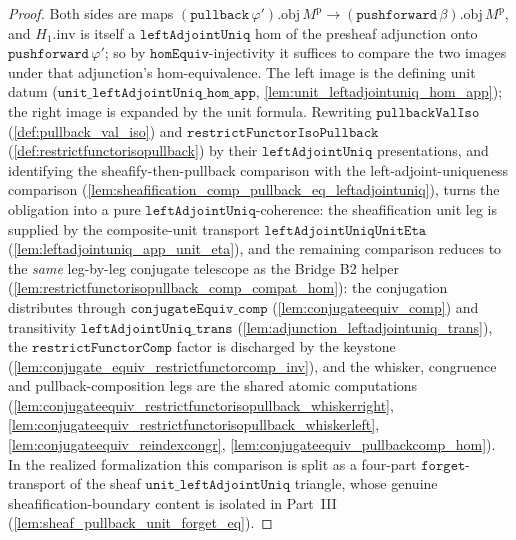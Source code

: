 \begin{proof}
    \leanok
  Both sides are maps \((\mathtt{pullback}\,\varphi').\mathrm{obj}\,M^{\mathrm p} \to
  (\mathtt{pushforward}\,\beta).\mathrm{obj}\,M^{\mathrm p}\), and \(H_1.\mathrm{inv}\) is itself a
  \(\mathtt{leftAdjointUniq}\) hom of the presheaf adjunction onto \(\mathtt{pushforward}\,\varphi'\);
  so by \(\mathtt{homEquiv}\)-injectivity it suffices to compare the two images under that adjunction's
  hom-equivalence. The left image is the defining unit datum
  (\(\mathtt{unit\_leftAdjointUniq\_hom\_app}\), \cref{lem:unit_leftadjointuniq_hom_app}); the right image
  is expanded by the unit formula. Rewriting \(\mathtt{pullbackValIso}\)
  (\cref{def:pullback_val_iso}) and \(\mathtt{restrictFunctorIsoPullback}\)
  (\cref{def:restrictfunctorisopullback}) by their \(\mathtt{leftAdjointUniq}\) presentations, and
  identifying the sheafify-then-pullback comparison with the left-adjoint-uniqueness comparison
  (\cref{lem:sheafification_comp_pullback_eq_leftadjointuniq}), turns the obligation into a pure
  \(\mathtt{leftAdjointUniq}\)-coherence: the sheafification unit leg is supplied by the composite-unit
  transport \(\mathtt{leftAdjointUniqUnitEta}\) (\cref{lem:leftadjointuniq_app_unit_eta}), and the
  remaining comparison reduces to the \emph{same} leg-by-leg conjugate telescope as the Bridge B2
  helper (\cref{lem:restrictfunctorisopullback_comp_compat_hom}): the conjugation distributes through
  \(\mathtt{conjugateEquiv\_comp}\) (\cref{lem:conjugateequiv_comp}) and transitivity
  \(\mathtt{leftAdjointUniq\_trans}\) (\cref{lem:adjunction_leftadjointuniq_trans}), the
  \(\mathtt{restrictFunctorComp}\) factor is discharged by the keystone
  (\cref{lem:conjugate_equiv_restrictfunctorcomp_inv}), and the whisker, congruence and
  pullback-composition legs are the shared atomic computations
  (\cref{lem:conjugateequiv_restrictfunctorisopullback_whiskerright},
  \cref{lem:conjugateequiv_restrictfunctorisopullback_whiskerleft},
  \cref{lem:conjugateequiv_reindexcongr}, \cref{lem:conjugateequiv_pullbackcomp_hom}).
  In the realized formalization this comparison is split as a four-part \(\mathtt{forget}\)-transport
  of the sheaf \(\mathtt{unit\_leftAdjointUniq}\) triangle, whose genuine sheafification-boundary
  content is isolated in Part~III (\cref{lem:sheaf_pullback_unit_forget_eq}).
\end{proof}

